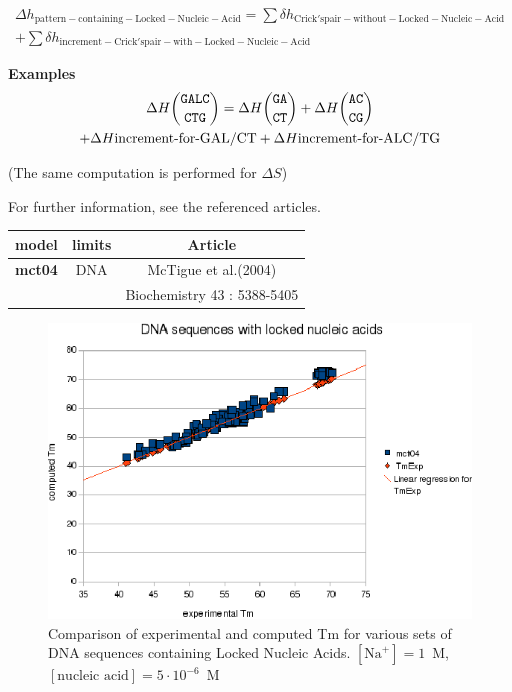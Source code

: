 \documentclass{article}
\begin{document}
\begin{multline*}
\Delta{}h_\mathrm{pattern-containing-Locked-Nucleic-Acid} =
\sum \delta{}h_\mathrm{Crick's pair-without-Locked-Nucleic-Acid} \\ +
\sum \delta{}h_\mathrm{increment-Crick's pair-with-Locked-Nucleic-Acid}
\end{multline*}

\textbf{Examples}
\begin{multline*}
\Delta H {\mbox{\texttt{GALC}} \choose \mbox{\texttt{CTG}}} = 
\Delta H {\mbox{\texttt{GA}} \choose \mbox{\texttt{CT}}} +
\Delta H {\mbox{\texttt{AC}} \choose \mbox{\texttt{CG}}} \\ +
\Delta H {\mbox{increment-for-GAL/CT}} +
\Delta H {\mbox{increment-for-ALC/TG}}\\
\end{multline*}

       (The same computation is performed for $\Delta S$) 
       
For further information, see the referenced articles.

\begin{table}[hc]
\begin{tabular}[h]{| c | c | c |}
\textbf{model} & \textbf{limits} & \textbf{Article} \\
\hline
\textbf{mct04} & DNA & McTigue et al.(2004)\\
 & & Biochemistry 43 : 5388-5405\\
\hline
\end{tabular}
\end{table}

\begin{figure}[h]
\includegraphics[width=1\linewidth]{images/LockedNucleicAcid}
\caption{Comparison of experimental and computed Tm for various sets of
 DNA sequences containing Locked Nucleic Acids. $[\mbox{Na}^+] = 1$~M, $[\mbox{nucleic acid}] = 5\cdot{}10^{-6}$~M}
\end{figure}
      
\end{document}
